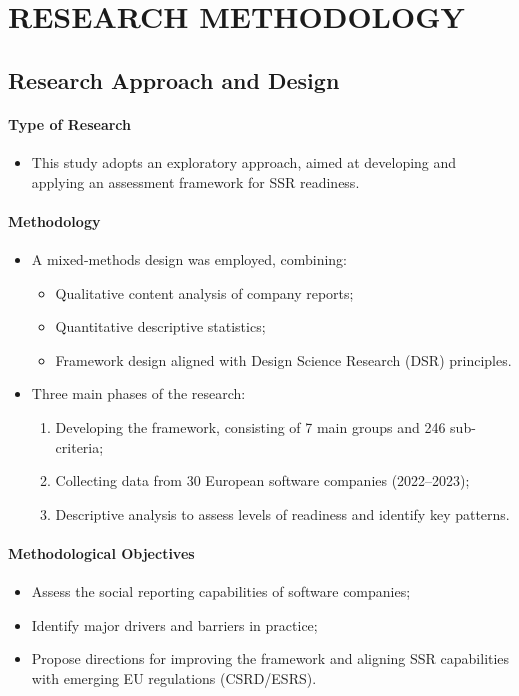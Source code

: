 \chapter{RESEARCH METHODOLOGY}

\section{Research Approach and Design}
\subsubsection{Type of Research}
\begin{itemize}
    \item This study adopts an exploratory approach, aimed at developing and applying an assessment framework for SSR readiness.
\end{itemize}

\subsubsection{Methodology}
\begin{itemize}
    \item A mixed-methods design was employed, combining:
    \begin{itemize}
        \item Qualitative content analysis of company reports;
        \item Quantitative descriptive statistics;
        \item Framework design aligned with Design Science Research (DSR) principles.
    \end{itemize}
    \item Three main phases of the research:
    \begin{enumerate}
        \item Developing the framework, consisting of 7 main groups and 246 sub-criteria;
        \item Collecting data from 30 European software companies (2022--2023);
        \item Descriptive analysis to assess levels of readiness and identify key patterns.
    \end{enumerate}
\end{itemize}

\subsubsection{Methodological Objectives}
\begin{itemize}
    \item Assess the social reporting capabilities of software companies;
    \item Identify major drivers and barriers in practice;
    \item Propose directions for improving the framework and aligning SSR capabilities with emerging EU regulations (CSRD/ESRS).
\end{itemize}

